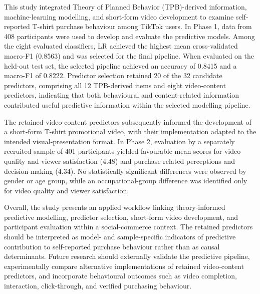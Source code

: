 \documentclass[jtaer,article,submit,moreauthors]{Definitions/mdpi}
\begin{document}
This study integrated Theory of Planned Behavior (TPB)-derived
information, machine-learning modelling, and short-form video
development to examine self-reported T-shirt purchase behaviour among
TikTok users. In Phase 1, data from 408 participants were used to
develop and evaluate the predictive models. Among the eight evaluated
classifiers, LR achieved the highest mean cross-validated macro-F1
(0.8563) and was selected for the final pipeline. When evaluated on the
held-out test set, the selected pipeline achieved an accuracy of 0.8415
and a macro-F1 of 0.8222. Predictor selection retained 20 of the 32
candidate predictors, comprising all 12 TPB-derived items and eight
video-content predictors, indicating that both behavioural and
content-related information contributed useful predictive information
within the selected modelling pipeline.

The retained video-content predictors subsequently informed the
development of a short-form T-shirt promotional video, with their
implementation adapted to the intended visual-presentation format. In
Phase 2, evaluation by a separately recruited sample of 401 participants
yielded favourable mean scores for video quality and viewer satisfaction
(4.48) and purchase-related perceptions and decision-making (4.34). No
statistically significant differences were observed by gender or age
group, while an occupational-group difference was identified only for
video quality and viewer satisfaction.

Overall, the study presents an applied workflow linking theory-informed
predictive modelling, predictor selection, short-form video development,
and participant evaluation within a social-commerce context. The
retained predictors should be interpreted as model- and sample-specific
indicators of predictive contribution to self-reported purchase
behaviour rather than as causal determinants. Future research should
externally validate the predictive pipeline, experimentally compare
alternative implementations of retained video-content predictors, and
incorporate behavioural outcomes such as video completion, interaction,
click-through, and verified purchasing behaviour.

%
\end{document}
